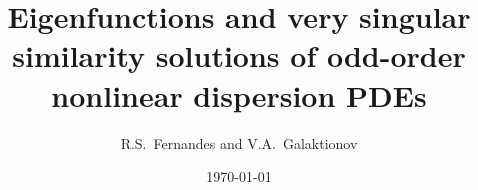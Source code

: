 \documentclass[12pt]{amsart}
\begin{document}
\newtheorem{theorem}{Theorem}
\newtheorem{proposition}{Proposition}
\newtheorem{lemma}{Lemma}
\newtheorem{corollary}{Corollary}
\newtheorem{definition}{Definition}
\newtheorem{remark}{Remark}

 
 
 

 

 

\title
{\bf
Eigenfunctions and very singular similarity solutions of odd-order
nonlinear dispersion PDEs}

\author {R.S.~Fernandes and V.A.~Galaktionov}

\address{Department of Mathematical Sciences, University of Bath,
 Bath BA2 7AY, UK}

\address{Department of Mathematical Sciences, University of Bath,
 Bath BA2 7AY, UK}

 
 
 

\date{\today}
 

\end{document}
